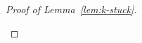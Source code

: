 \begin{proof}[Proof of Lemma~\ref{lem:k-stuck}]
\begin{description}
\begin{description}
    \end{description}
  \end{description}





\end{proof}
